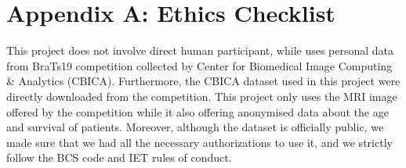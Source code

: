 \chapter{Appendix A: Ethics Checklist}
This project does not involve direct human participant, while uses personal data from BraTs19 competition collected by Center for Biomedical Image Computing \& Analytics (CBICA). Furthermore, the CBICA dataset used in this project were directly downloaded from the competition. This project only uses the MRI image offered by the competition while it also offering anonymised data about the age and survival of patients. Moreover, although the dataset is officially public, we made sure that we had all the necessary authorizations to use it, and we strictly follow the BCS code and IET rules of conduct.\\

